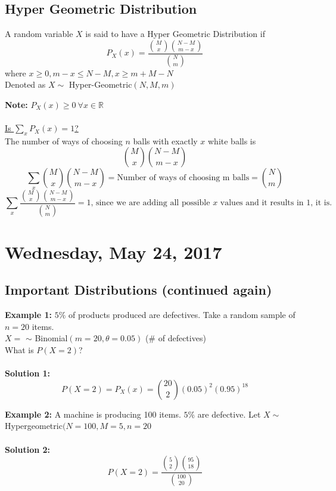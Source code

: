 \documentclass[12pt, twoside]{article}
\begin{document}
\subsection{Hyper Geometric Distribution}
\begin{tcolorbox}[title=Definition: Hyper Geometric Distribution]
	A random variable $X$ is said to have a Hyper Geometric Distribution if
	$$P_X (x) = \frac{\binom{M}{x} \binom{N-M}{m-x}}{\binom{N}{m}}$$
	where $x \geq 0, m-x \leq N-M, x \geq m + M - N$\\
	Denoted as $X\sim$ Hyper-Geometric$(N,M,m)$
\end{tcolorbox}

\textbf{Note: } $P_X (x) \geq 0 \: \forall x\in\mathbb{R}$\\
\\
\underline{Is $\sum_x P_X (x) = 1$?}\\
The number of ways of choosing $n$ balls with exactly $x$ white balls is
$$\binom{M}{x}\binom{N-M}{m-x}$$
$$\sum_x \binom{M}{x}\binom{N-M}{m-x} = \text{Number of ways of choosing m balls} = \binom{N}{m}$$
$$\sum_x \frac{\binom{M}{x}\binom{N-M}{m-x}}{\binom{N}{m}} = 1 \text{, since we are adding all possible $x$ values and it results in 1, it is.}$$



\newpage

\section{Wednesday, May 24, 2017}

\subsection{Important Distributions (continued again)}

\textbf{Example 1:} $5\%$ of products produced are defectives. Take a random sample of $n = 20$ items.\\
$X = $ $\sim$ Binomial$(m = 20, \theta = 0.05)$  (\# of defectives)\\
What is $P(X = 2)$?\\
\\
\textbf{Solution 1:} $$P(X = 2) = P_X (x) = \binom{20}{2} (0.05)^2 (0.95)^{18}$$

\textbf{Example 2:} A machine is producing 100 items. $5\%$ are defective. Let $X \sim $ Hypergeometric$(N = 100, M = 5, n = 20$\\
\\
\textbf{Solution 2:} $$P(X = 2) = \frac{\binom{5}{2} \binom{95}{18}}{ \binom{100}{20}}$$
\end{document}
